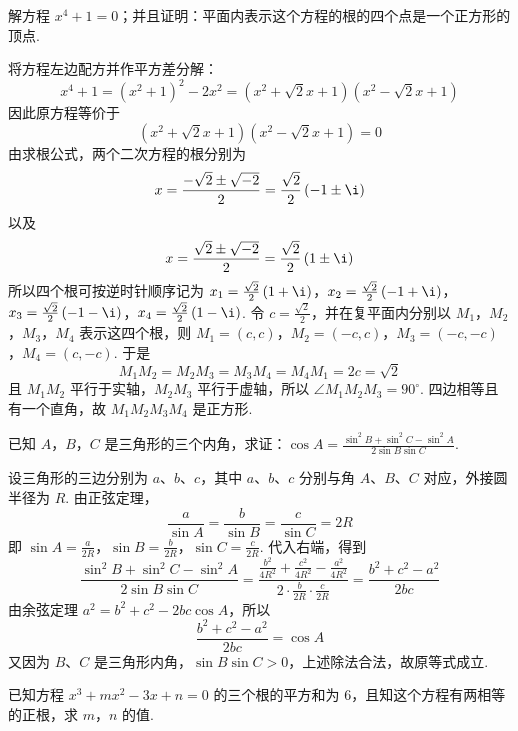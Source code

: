 \documentclass[UTF8,a4paper,oneside,11pt]{ctexbook}
\begin{document}
\begin{problem}
解方程 \(x^4+1=0\)；并且证明：平面内表示这个方程的根的四个点是一个正方形的顶点.
\end{problem}

\begin{solution}
将方程左边配方并作平方差分解：
\[
x^4+1=\left( x^2+1 \right)^2-2x^2
=\left( x^2+\sqrt2x+1 \right)\left( x^2-\sqrt2x+1 \right)
\]
因此原方程等价于
\[
\left( x^2+\sqrt2x+1 \right)\left( x^2-\sqrt2x+1 \right)=0
\]
由求根公式，两个二次方程的根分别为
\[
x=\frac{-\sqrt2\pm\sqrt{-2}}{2}=\frac{\sqrt2}{2}\left( -1\pm\i \right)
\]
以及
\[
x=\frac{\sqrt2\pm\sqrt{-2}}{2}=\frac{\sqrt2}{2}\left( 1\pm\i \right)
\]
所以四个根可按逆时针顺序记为 \(x_1=\frac{\sqrt2}{2}\left( 1+\i \right)\)，\(x_2=\frac{\sqrt2}{2}\left( -1+\i \right)\)，\(x_3=\frac{\sqrt2}{2}\left( -1-\i \right)\)，\(x_4=\frac{\sqrt2}{2}\left( 1-\i \right)\).
令 \(c=\frac{\sqrt2}{2}\)，并在复平面内分别以 \(M_1\)，\(M_2\)，\(M_3\)，\(M_4\) 表示这四个根，则
\(M_1=(c,c)\)，\(M_2=(-c,c)\)，\(M_3=(-c,-c)\)，\(M_4=(c,-c)\).
于是
\[
M_1M_2=M_2M_3=M_3M_4=M_4M_1=2c=\sqrt2
\]
且 \(M_1M_2\) 平行于实轴，\(M_2M_3\) 平行于虚轴，所以 \(\angle M_1M_2M_3=90^\circ\). 四边相等且有一个直角，故 \(M_1M_2M_3M_4\) 是正方形.

\end{solution}

\begin{problem}
已知 \(A\)，\(B\)，\(C\) 是三角形的三个内角，求证：\(\cos A=\frac{\sin^2B+\sin^2C-\sin^2A}{2\sin B\sin C}\).
\end{problem}

\begin{solution}
设三角形的三边分别为 \(a\)、\(b\)、\(c\)，其中 \(a\)、\(b\)、\(c\) 分别与角 \(A\)、\(B\)、\(C\) 对应，外接圆半径为 \(R\). 由正弦定理，
\[
\frac{a}{\sin A}=\frac{b}{\sin B}=\frac{c}{\sin C}=2R
\]
即 \(\sin A=\frac{a}{2R}\)，\(\sin B=\frac{b}{2R}\)，\(\sin C=\frac{c}{2R}\).
代入右端，得到
\[
\frac{\sin^2B+\sin^2C-\sin^2A}{2\sin B\sin C}
=\frac{\frac{b^2}{4R^2}+\frac{c^2}{4R^2}-\frac{a^2}{4R^2}}{2\cdot\frac{b}{2R}\cdot\frac{c}{2R}}
=\frac{b^2+c^2-a^2}{2bc}
\]
由余弦定理 \(a^2=b^2+c^2-2bc\cos A\)，所以
\[
\frac{b^2+c^2-a^2}{2bc}=\cos A
\]
又因为 \(B\)、\(C\) 是三角形内角，\(\sin B\sin C>0\)，上述除法合法，故原等式成立.
\end{solution}

\begin{problem}
已知方程 \(x^3+mx^2-3x+n=0\) 的三个根的平方和为 \(6\)，且知这个方程有两相等的正根，求 \(m\)，\(n\) 的值.
\end{problem}
\end{document}
